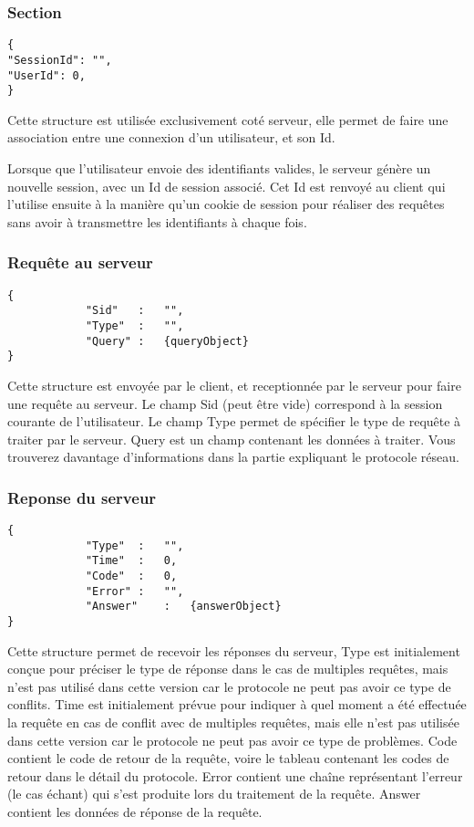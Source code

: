 \subsubsection{Section}
\begin{lstlisting}
{
"SessionId": "",
"UserId": 0,
}
\end{lstlisting}
Cette structure est utilisée exclusivement coté serveur, elle permet de faire une association entre une connexion d'un utilisateur, et son Id.\par
Lorsque que l'utilisateur envoie des identifiants valides, le serveur génère un nouvelle session, avec un Id de session associé. Cet Id est renvoyé au client qui l'utilise ensuite à la manière qu'un cookie de session pour réaliser des requêtes sans avoir à transmettre les identifiants à chaque fois.

\subsubsection{Requête au serveur}
\begin{lstlisting}
{
			"Sid"	:	"",
			"Type"	:	"",
			"Query"	:	{queryObject}
}
\end{lstlisting}

Cette structure est envoyée par le client, et receptionnée par le serveur pour faire une requête au serveur. Le champ \og Sid \fg (peut être vide) correspond à la session courante de l'utilisateur.
Le champ \og Type \fg permet de spécifier le type de requête à traiter par le serveur.
\og Query \fg est un champ contenant les données à traiter. Vous trouverez davantage d'informations dans la partie expliquant le protocole réseau.

\subsubsection{Reponse du serveur}
\begin{lstlisting}
{
			"Type"	:	"",
			"Time"	:	0,
			"Code"	:	0,
			"Error"	:	"",
			"Answer"	:	{answerObject}
}
\end{lstlisting}
Cette structure permet de recevoir les réponses du serveur, \og Type \fg est initialement conçue pour préciser le type de réponse dans le cas de multiples requêtes, mais n'est pas utilisé dans cette version car le protocole ne peut pas avoir ce type de conflits. \og Time \fg est initialement prévue pour indiquer à quel moment a été effectuée la requête en cas de conflit avec de multiples requêtes, mais elle n'est pas utilisée dans cette version car le protocole ne peut pas avoir ce type de problèmes. \og Code \fg contient le code de retour de la requête, voire le tableau contenant les codes de retour dans le détail du protocole. \og Error \fg contient une chaîne représentant l'erreur (le cas échant) qui s'est produite lors du traitement de la requête. \og Answer \fg contient les données de réponse de la requête.

% 

